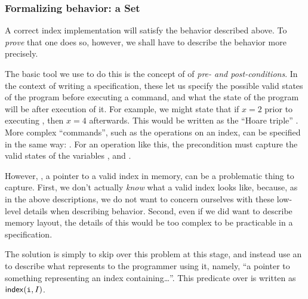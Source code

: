 \subsubsection{Formalizing behavior: a Set \ADT}

A correct index implementation will satisfy the behavior described above.
To \emph{prove} that one does so, however,
  we shall have to describe the behavior more precisely.

The basic tool we use to do this is the concept of of \emph{pre- and post-conditions}.\footnotemark
In the context of writing a specification,
  these let us specify the possible valid states of the program before executing a command,
  and what the state of the program will be after execution of it.
For example, we might state that if $x=2$ prior to executing ,
  then $x=4$ afterwards.
This would be written as the \enquote{Hoare triple}
  .\footnotemark
More complex \enquote{commands},
  such as the operations on an index,
  can be specified in the same way:
  .
For an operation like this,
  the precondition must capture
  the valid states of the variables ,  and .



However, , a pointer to a valid index in memory,
can be a problematic thing to capture.
First, we don't actually \emph{know} what a valid index looks like,
  because, as in the above descriptions,
  we do not want to concern ourselves with these low-level details
  when describing behavior.
Second, even if we did want to describe memory layout,
  the details of this would be too complex to be practicable in a specification.

The solution is simply to skip over this problem at this stage,
  and instead use an 
  to describe what  represents to the programmer using it,
  namely, \enquote{a pointer to something representing an index containing…}.
This predicate over  is written as $\mathsf{index}(\texttt{i}, I)$.

